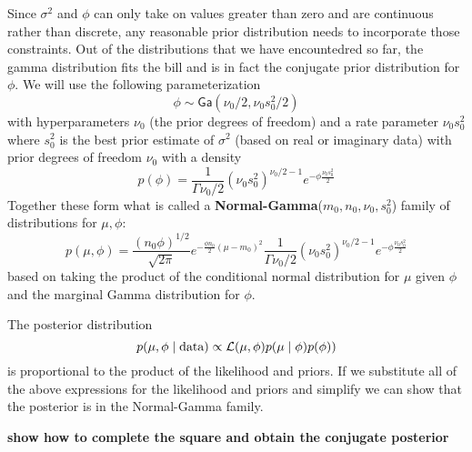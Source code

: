 \documentclass[11pt]{article}
\def\Ga{\textsf{Ga}}
\def\data{\text{data}}
\begin{document}
Since $\sigma^2$ and $\phi$ can only take on values greater than zero and are continuous rather than discrete,  any reasonable prior distribution needs to incorporate those constraints.  Out of the distributions that we have encountedred so far, the gamma distribution fits the bill and is in fact the conjugate prior distribution for $\phi$.  We will use the following parameterization
$$
\phi \sim \Ga(\nu_0/2, \nu_0 s^2_0/2)
$$
with hyperparameters  $\nu_0$ (the prior degrees of freedom) and a rate parameter $\nu_0 s^2_0$ where $s^2_0$ is the best prior estimate of $\sigma^2$  (based on real or imaginary data) with prior degrees of freedom $\nu_0$ with a density
$$p(\phi) = \frac{1}{\Gamma{\nu_0/2}} (\nu_0 s^2_0 )^{\nu_0/2 -1} e^{- \phi \frac{\nu_0 s^2_0} {2}}
$$
Together these form what is called a {\bf Normal-Gamma}($m_0, n_0, \nu_0, s^2_0$) family of distributions for $\mu, \phi$:
$$
p(\mu, \phi) = \frac{(n_0 \phi)^{1/2}} {\sqrt{2\pi}} e^{- \frac{\phi n_0}{2} (\mu -m_0)^2} \frac{1}{\Gamma{\nu_0/2}} (\nu_0 s^2_0 )^{\nu_0/2 -1} e^{- \phi \frac{\nu_0 s^2_0} {2}}
$$
based on taking the product of the conditional normal distribution for $\mu$ given $\phi$ and the marginal Gamma  distribution for $\phi$.

The posterior distribution 
$$
p(\mu, \phi \mid \data) \propto {\cal{L}}(\mu, \phi) p(\mu \mid \phi) p(\phi)
)
$$
is proportional to the product of the likelihood and priors.
If we substitute all of the above expressions for the likelihood and priors and simplify we can show that the posterior is in the Normal-Gamma family.

{\bf show how to complete the square and obtain the conjugate posterior}
\end{document}
